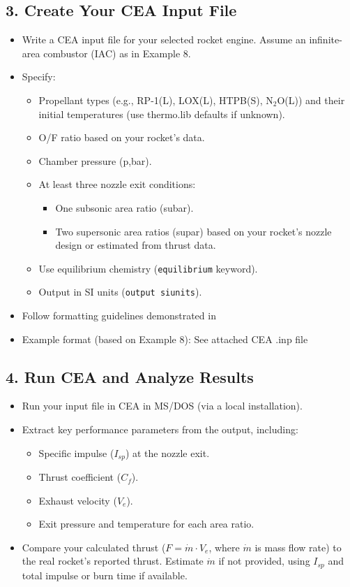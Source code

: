 \documentclass[12pt]{article}
\begin{document}
\subsection{3. Create Your CEA Input File}
\begin{itemize}
    \item Write a CEA input file for your selected rocket engine. Assume an infinite-area combustor (IAC) as in Example 8.
    \item Specify:
    \begin{itemize}
        \item Propellant types (e.g., RP-1(L), LOX(L), HTPB(S), N$_2$O(L)) and their initial temperatures (use thermo.lib defaults if unknown).
        \item O/F ratio based on your rocket's data.
        \item Chamber pressure (p,bar).
        \item At least three nozzle exit conditions:
        \begin{itemize}
            \item One subsonic area ratio (subar).
            \item Two supersonic area ratios (supar) based on your rocket's nozzle design or estimated from thrust data.
        \end{itemize}
        \item Use equilibrium chemistry (\texttt{equilibrium} keyword).
        \item Output in SI units (\texttt{output siunits}).
    \end{itemize}
    \item Follow formatting guidelines demonstrated in \cite{lecture7}
    \item Example format (based on Example 8): See attached CEA .inp file

\end{itemize}

\subsection{4. Run CEA and Analyze Results}
\begin{itemize}
    \item Run your input file in CEA in MS/DOS (via a local installation).
    \item Extract key performance parameters from the output, including:
    \begin{itemize}
        \item Specific impulse ($I_{sp}$) at the nozzle exit.
        \item Thrust coefficient ($C_f$).
        \item Exhaust velocity ($V_e$).
        \item Exit pressure and temperature for each area ratio.
    \end{itemize}
    \item Compare your calculated thrust ($F = \dot{m} \cdot V_e$, where $\dot{m}$ is mass flow rate) to the real rocket's reported thrust. Estimate $\dot{m}$ if not provided, using $I_{sp}$ and total impulse or burn time if available.
\end{itemize}
\end{document}

